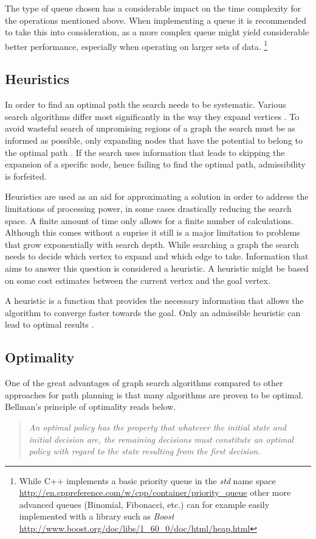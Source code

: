 The type of queue chosen has a considerable impact on the time complexity for the operations mentioned above. When implementing a queue it is recommended to take this into consideration, as a more complex queue might yield considerable better performance, especially when operating on larger sets of data. \footnote{While C++ implements a basic priority queue in the \emph{std} name space \url{http://en.cppreference.com/w/cpp/container/priority_queue} other more advanced queues (Binomial, Fibonacci, etc.) can for example easily implemented with a library such as \emph{Boost} \url{http://www.boost.org/doc/libs/1_60_0/doc/html/heap.html}}

\subsection{Heuristics}
In order to find an optimal path the search needs to be systematic. Various search algorithms differ most significantly in the way they expand vertices \cite{LaValle.2006}. To avoid wasteful search of unpromising regions of a graph the search must be as informed as possible, only expanding nodes that have the potential to belong to the optimal path \cite{Hart.1968}. If the search uses information that leads to skipping the expansion of a specific node, hence failing to find the optimal path, admissibility is forfeited.

Heuristics are used as an aid for approximating a solution in order to address the limitations of processing power, in some cases drastically reducing the search space. A finite amount of time only allows for a finite number of calculations. Although this comes without a suprise it still is a major limitation to problems that grow exponentially with search depth. While searching a graph the search needs to decide which vertex to expand and which edge to take. Information that aims to answer this question is considered a heuristic. A heuristic might be based on some cost estimates between the current vertex and the goal vertex. \cite{Newell.1976} 

A heuristic is a function that provides the necessary information that allows the algorithm to converge faster towards the goal. Only an admissible heuristic can lead to optimal results \cite{Hart.1968}.

\subsection{Optimality}
One of the great advantages of graph search algorithms compared to other approaches for path planning is that many algorithms are proven to be optimal. Bellman's principle of optimality reads below.
\begin{quotation}
    \noindent \emph{An optimal policy has the property that whatever the initial state and initial decision are, the remaining decisions must constitute an optimal policy with regard to the state resulting from the first decision.} \cite{Bellman.2003}
\end{quotation}

